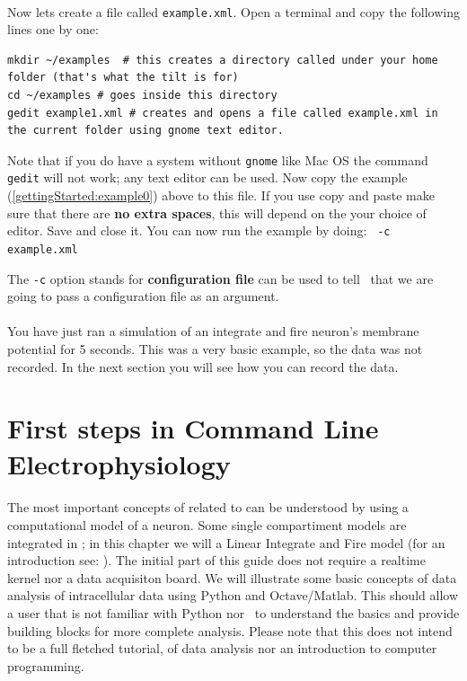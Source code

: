 \paragraph{}
Now lets create a file called \texttt{example.xml}. Open a terminal
and copy the following lines one by one:

\begin{lstlisting}[escapeinside=\{\}]
mkdir ~/examples  # this creates a directory called under your home folder (that's what the tilt is for)
cd ~/examples # goes inside this directory
gedit example1.xml # creates and opens a file called example.xml in the current folder using gnome text editor.
\end{lstlisting}

Note that if you do have a system without \texttt{gnome} like Mac OS
the command \texttt{gedit} will not work; any text editor can be
used. Now copy the example (\ref{gettingStarted:example0}) above to
this file. If you use copy and paste make sure that there are
\textbf{no extra spaces}, this will depend on the your choice of
editor. Save and close it. You can now run the example by doing:
\texttt{\progname\ -c example.xml}

The \texttt{-c} option stands for \textbf{configuration file} can be
used to tell \progname\ that we are going to pass a configuration file
as an argument.

\paragraph{} You have just ran a simulation of an integrate and fire neuron's membrane potential for 5 seconds. This was a very basic example, so the data was not recorded. In the next section you will see how you can record the data.
\fi
\section{First steps in Command Line Electrophysiology}
\paragraph{}
The most important concepts of related to \progname can be understood by using a computational model of a neuron. Some single compartiment models are integrated in \progname; in this chapter we will a Linear Integrate and Fire model (for an introduction see: \cite{Koch:1989}). The initial part of this guide does not require a realtime kernel nor a data acquisiton board.
We will illustrate some basic concepts of data analysis of intracellular data using Python and Octave/Matlab. This should allow a user that is not familiar with Python nor \matlab\ to understand the basics and provide building blocks for more complete analysis. Please note that this does not intend to be a full fletched tutorial, of data analysis nor an introduction to computer programming. 

